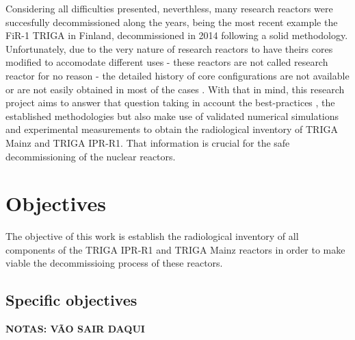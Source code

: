 \documentclass[11pt]{article} %
\begin{document}
Considering all difficulties presented, neverthless, many research reactors were succesfully decommissioned along the years, being the most recent example the FiR-1 TRIGA in Finland, decommissioned in 2014 \cite{Raty_Thesis_2020} following a solid methodology. Unfortunately, due to the very nature of research reactors to have theirs cores modified to accomodate different uses - these reactors are not called research reactor for no reason - the detailed history of core configurations are not available or are not easily obtained in most of the cases \cite[p. xxx]{Clean-up_CEA-e-DEN_2018}. With that in mind, this research project aims to answer that question taking in account the best-practices \cite{AIEA}, the established methodologies \cite{Raty_paper} but also make use of validated numerical simulations and experimental measurements to obtain the radiological inventory of TRIGA Mainz and TRIGA IPR-R1. That information is crucial for the safe decommissioning of the nuclear reactors. %





\section{Objectives}

The objective of this work is establish the radiological inventory of all components of the TRIGA IPR-R1 and TRIGA Mainz reactors in order to make viable the decommissioing process of these reactors. 



\subsection{Specific objectives}

\textbf{NOTAS: VÃO SAIR DAQUI}
\end{document}
